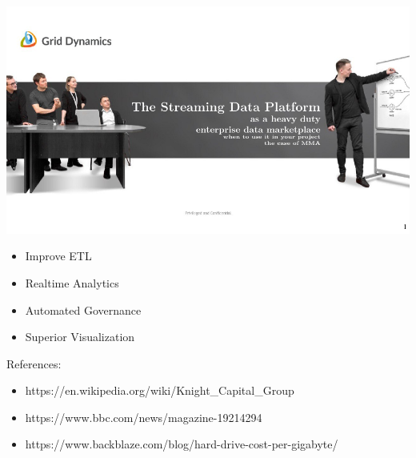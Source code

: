 \documentclass[aspectratio=169, 15pt,usenames,dvipsnames]{beamer}
\begin{document}
\begin{gdsw}
	\centering\includegraphics[height=0.5\textheight]{sdp}         
	\par
	\begin{center}
		\begin{itemize}
			\centering
			\item Improve ETL
			\item Realtime Analytics
			\item Automated Governance
			\item Superior Visualization
		\end{itemize}
	\end{center}
\end{gdsw}
\begin{gdsw}
	References:
	\begin{center}\small
		\begin{itemize}
			\item https://en.wikipedia.org/wiki/Knight\_Capital\_Group
			\item https://www.bbc.com/news/magazine-19214294
			\item https://www.backblaze.com/blog/hard-drive-cost-per-gigabyte/
		\end{itemize}
	\end{center}
\end{gdsw}
    	
\end{document}
